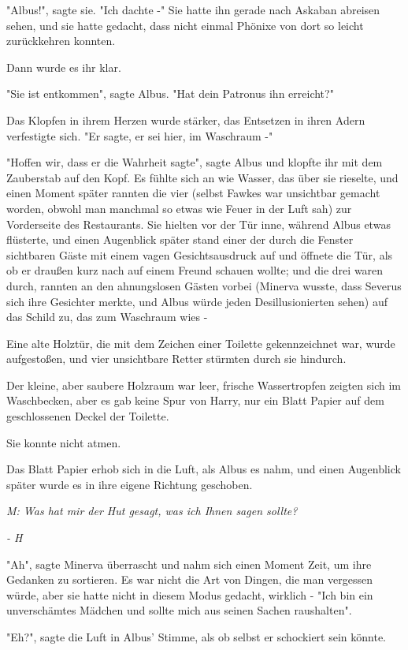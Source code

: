 {"Albus!", sagte sie. "Ich dachte -" Sie hatte ihn gerade nach Askaban abreisen sehen, und sie hatte gedacht, dass nicht einmal Phönixe von dort so leicht zurückkehren konnten.

Dann wurde es ihr klar.

"Sie ist entkommen", sagte Albus. "Hat dein Patronus ihn erreicht?"

Das Klopfen in ihrem Herzen wurde stärker, das Entsetzen in ihren Adern verfestigte sich. "Er sagte, er sei hier, im Waschraum -"

"Hoffen wir, dass er die Wahrheit sagte", sagte Albus und klopfte ihr mit dem Zauberstab auf den Kopf. Es fühlte sich an wie Wasser, das über sie rieselte, und einen Moment später rannten die vier (selbst Fawkes war unsichtbar gemacht worden, obwohl man manchmal so etwas wie Feuer in der Luft sah) zur Vorderseite des Restaurants. Sie hielten vor der Tür inne, während Albus etwas flüsterte, und einen Augenblick später stand einer der durch die Fenster sichtbaren Gäste mit einem vagen Gesichtsausdruck auf und öffnete die Tür, als ob er draußen kurz nach auf einem Freund schauen wollte; und die drei waren durch, rannten an den ahnungslosen Gästen vorbei (Minerva wusste, dass Severus sich ihre Gesichter merkte, und Albus würde jeden Desillusionierten sehen) auf das Schild zu, das zum Waschraum wies -

Eine alte Holztür, die mit dem Zeichen einer Toilette gekennzeichnet war, wurde aufgestoßen, und vier unsichtbare Retter stürmten durch sie hindurch.

Der kleine, aber saubere Holzraum war leer, frische Wassertropfen zeigten sich im Waschbecken, aber es gab keine Spur von Harry, nur ein Blatt Papier auf dem geschlossenen Deckel der Toilette.

Sie konnte nicht atmen.

Das Blatt Papier erhob sich in die Luft, als Albus es nahm, und einen Augenblick später wurde es in ihre eigene Richtung geschoben.

\emph{\emph{M: Was hat mir der Hut gesagt, was ich Ihnen sagen sollte?}}

\emph{\emph{- H}}

"Ah", sagte Minerva überrascht und nahm sich einen Moment Zeit, um ihre Gedanken zu sortieren. Es war nicht die Art von Dingen, die man vergessen würde, aber sie hatte nicht in diesem Modus gedacht, wirklich - "Ich bin ein unverschämtes Mädchen und sollte mich aus seinen Sachen raushalten".

"Eh?", sagte die Luft in Albus' Stimme, als ob selbst er schockiert sein könnte.

}
